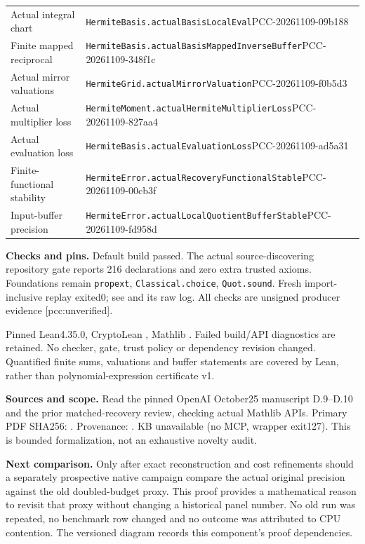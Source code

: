 \documentclass[11pt]{article}
\begin{document}
\begin{tabular}{p{}p{}}
Actual integral chart & \texttt{HermiteBasis.actualBasisLocalEval}\newline PCC-20261109-09b188\\[4pt]
Finite mapped reciprocal & \texttt{HermiteBasis.}\newline\texttt{actualBasisMappedInverseBuffer}\newline PCC-20261109-348f1c\\[4pt]
Actual mirror valuations & \texttt{HermiteGrid.actualMirrorValuation}\newline PCC-20261109-f0b5d3\\[4pt]
Actual multiplier loss & \texttt{HermiteMoment.actualHermiteMultiplierLoss}\newline PCC-20261109-827aa4\\[4pt]
Actual evaluation loss & \texttt{HermiteBasis.actualEvaluationLoss}\newline PCC-20261109-ad5a31\\[4pt]
Finite-functional stability & \texttt{HermiteError.actualRecoveryFunctionalStable}\newline PCC-20261109-00cb3f\\[4pt]
Input-buffer precision & \texttt{HermiteError.}\newline\texttt{actualLocalQuotientBufferStable}\newline PCC-20261109-fd958d
\end{tabular}

\textbf{Checks and pins.}
Default build passed. The actual source-discovering repository gate reports
216 declarations and zero extra trusted axioms. Foundations remain
\texttt{propext}, \texttt{Classical.choice}, \texttt{Quot.sound}.
Fresh import-inclusive replay exited0; see
 and its raw log.
All checks are unsigned producer evidence [pcc:unverified].

Pinned Lean4.35.0, CryptoLean
, Mathlib
.
Failed build/API diagnostics are retained. No checker, gate, trust policy or
dependency revision changed. Quantified finite sums, valuations and buffer
statements are covered by Lean, rather than polynomial-expression certificate v1.

\textbf{Sources and scope.}
Read the pinned OpenAI October25 manuscript D.9--D.10 and the prior
matched-recovery review, checking actual Mathlib APIs. Primary PDF SHA256:
.
Provenance: .
KB unavailable (no MCP, wrapper exit127). This is bounded formalization,
not an exhaustive novelty audit.

\textbf{Next comparison.}
Only after exact reconstruction and cost refinements should a separately
prospective native campaign compare the actual original precision against the
old doubled-budget proxy. This proof provides a mathematical reason to revisit
that proxy without changing a historical panel number. No old run was repeated,
no benchmark row changed and no outcome was attributed to CPU contention.
The versioned diagram records this component's proof dependencies.
\end{document}
